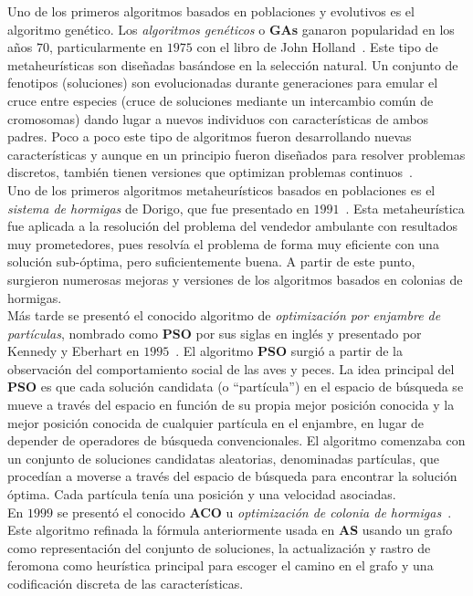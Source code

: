 Uno de los primeros algoritmos basados en poblaciones y evolutivos es el algoritmo genético. Los \textit{algoritmos genéticos} o \textbf{GAs} ganaron popularidad en los años $70$, particularmente en $1975$ con el libro de John Holland~\cite{Holland:1975}. Este tipo de metaheurísticas son diseñadas basándose en la selección natural. Un conjunto de fenotipos (soluciones) son evolucionadas durante generaciones para emular el cruce entre especies (cruce de soluciones mediante un intercambio común de cromosomas) dando lugar a nuevos individuos con características de ambos padres. Poco a poco este tipo de algoritmos fueron desarrollando nuevas características y aunque en un principio fueron diseñados para resolver problemas discretos, también tienen versiones que optimizan problemas continuos~\cite{eiben2015}.\\[6pt]
Uno de los primeros algoritmos metaheurísticos basados en poblaciones es el \textit{sistema de hormigas} de Dorigo, que fue presentado en $1991$~\cite{as}. Esta metaheurística fue aplicada a la resolución del problema del vendedor ambulante con resultados muy prometedores, pues resolvía el problema de forma muy eficiente con una solución sub-óptima, pero suficientemente buena. A partir de este punto, surgieron numerosas mejoras y versiones de los algoritmos basados en colonias de hormigas.\\[6pt]
Más tarde se presentó el conocido algoritmo de \textit{optimización por enjambre de partículas}, nombrado como \textbf{PSO} por sus siglas en inglés y presentado por Kennedy y Eberhart en $1995$~\cite{kennedy_particle_1995}. El algoritmo \textbf{PSO} surgió a partir de la observación del comportamiento social de las aves y peces. La idea principal del \textbf{PSO} es que cada solución candidata (o ``partícula'') en el espacio de búsqueda se mueve a través del espacio en función de su propia mejor posición conocida y la mejor posición conocida de cualquier partícula en el enjambre, en lugar de depender de operadores de búsqueda convencionales. El algoritmo comenzaba con un conjunto de soluciones candidatas aleatorias, denominadas partículas, que procedían a moverse a través del espacio de búsqueda para encontrar la solución óptima. Cada partícula tenía una posición y una velocidad asociadas.\\[6pt]
En $1999$ se presentó el conocido \textbf{ACO} u \textit{optimización de colonia de hormigas}~\cite{dorigo_ant_1999}. Este algoritmo refinada la fórmula anteriormente usada en \textbf{AS} usando un grafo como representación del conjunto de soluciones, la actualización y rastro de feromona como heurística principal para escoger el camino en el grafo y una codificación discreta de las características.\\[6pt]
